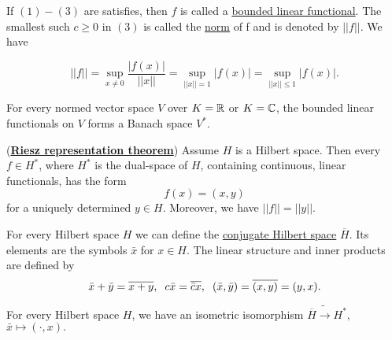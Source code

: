 If $(1)-(3)$ are satisfies, then $f$ is called a \underline{bounded linear functional}. The smallest such $c\geq 0$ in $(3)$ is called the \underline{norm} of f
and is denoted by $||f||$. We have 

$$||f|| = \sup_{x\neq 0}\frac{|f(x)|}{||x||}= \sup_{||x||=1}|f(x)| = \sup_{||x||\leq 1}|f(x)|.$$
\begin{proposition}
    For every normed vector space $V$ over $K=\mathbb{R}$ or $K=\mathbb{C}$, the bounded linear functionals on $V$ forms a Banach space $V^*$.
\end{proposition}
\begin{theorem}(\underline{\textbf{Riesz representation theorem}})
    Assume $H$ is a Hilbert space. Then every $f\in H^*$, where $H^*$ is the dual-space of $H$, containing continuous, linear functionals, has the form $$f(x) = (x,y)$$
    for a uniquely determined $y\in H$. Moreover, we have $||f|| = ||y||$.
    
\end{theorem}
For every Hilbert space $H$ we can define the \underline{conjugate Hilbert space} $\overline{H}$. Its elements are the symbols $\bar x$ for $x\in H$.
The linear structure and inner products are defined by $$\bar x + \bar y = \overline{x+y},\hspace{2mm} c\bar x = \overline{\bar c x},\hspace{2mm} (\bar x,\bar y) = \overline{(x,y)}=(y,x).$$
\begin{corollary}
    For every Hilbert space $H$, we have an isometric isomorphism $\overline{H}\tilde\rightarrow H^*,$ $\bar x \mapsto (\cdot,x).$
\end{corollary}